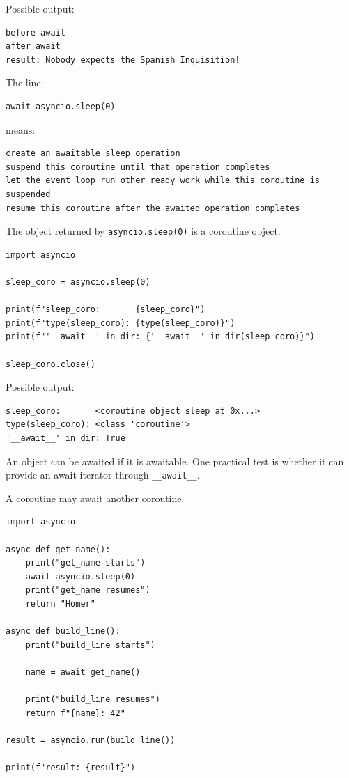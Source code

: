 Possible output:

\begin{verbatim}
before await
after await
result: Nobody expects the Spanish Inquisition!
\end{verbatim}

The line:

\begin{verbatim}
await asyncio.sleep(0)
\end{verbatim}

means:

\begin{verbatim}
create an awaitable sleep operation
suspend this coroutine until that operation completes
let the event loop run other ready work while this coroutine is suspended
resume this coroutine after the awaited operation completes
\end{verbatim}

The object returned by \texttt{asyncio.sleep(0)} is a coroutine object.

\begin{verbatim}
import asyncio

sleep_coro = asyncio.sleep(0)

print(f"sleep_coro:       {sleep_coro}")
print(f"type(sleep_coro): {type(sleep_coro)}")
print(f"'__await__' in dir: {'__await__' in dir(sleep_coro)}")

sleep_coro.close()
\end{verbatim}

Possible output:

\begin{verbatim}
sleep_coro:       <coroutine object sleep at 0x...>
type(sleep_coro): <class 'coroutine'>
'__await__' in dir: True
\end{verbatim}

An object can be awaited if it is awaitable. One practical test is whether it can provide an await iterator through \texttt{\_\_await\_\_}.

A coroutine may await another coroutine.

\begin{verbatim}
import asyncio

async def get_name():
    print("get_name starts")
    await asyncio.sleep(0)
    print("get_name resumes")
    return "Homer"

async def build_line():
    print("build_line starts")

    name = await get_name()

    print("build_line resumes")
    return f"{name}: 42"

result = asyncio.run(build_line())

print(f"result: {result}")
\end{verbatim}

